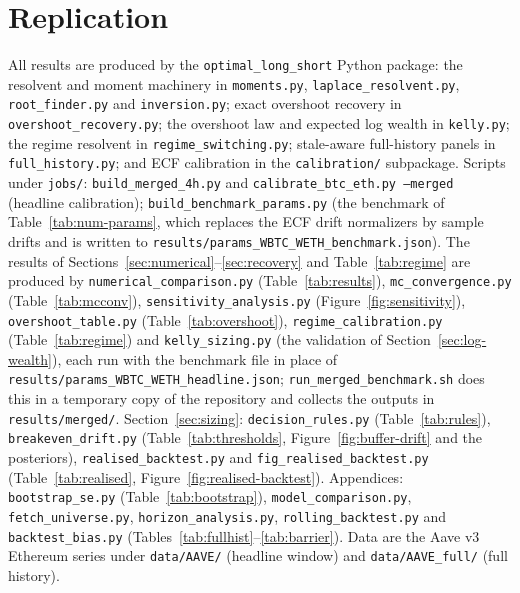 \documentclass[11pt]{article}
\theoremstyle{plain}
\theoremstyle{definition}
\theoremstyle{remark}
\begin{document}
\section*{Replication}
{\sloppy All results are produced by the \texttt{optimal\_long\_short} Python package: the resolvent and
moment machinery in \texttt{moments.py}, \texttt{laplace\_resolvent.py}, \texttt{root\_finder.py} and
\texttt{inversion.py}; exact overshoot recovery in \texttt{overshoot\_recovery.py}; the overshoot law
and expected log wealth in \texttt{kelly.py}; the regime resolvent in \texttt{regime\_switching.py};
stale-aware full-history panels in \texttt{full\_history.py}; and ECF calibration in the
\texttt{calibration/} subpackage. Scripts under \texttt{jobs/}: \texttt{build\_merged\_4h.py} and
\texttt{calibrate\_btc\_eth.py --merged} (headline calibration); \texttt{build\_benchmark\_params.py}
(the benchmark of Table~\ref{tab:num-params}, which replaces the ECF drift normalizers by sample
drifts and is written to \texttt{results/params\_WBTC\_WETH\_benchmark.json}). The results of
Sections~\ref{sec:numerical}--\ref{sec:recovery} and Table~\ref{tab:regime} are produced by
\texttt{numerical\_comparison.py} (Table~\ref{tab:results}), \texttt{mc\_convergence.py}
(Table~\ref{tab:mcconv}), \texttt{sensitivity\_analysis.py} (Figure~\ref{fig:sensitivity}),
\texttt{overshoot\_table.py} (Table~\ref{tab:overshoot}), \texttt{regime\_calibration.py}
(Table~\ref{tab:regime}) and \texttt{kelly\_sizing.py} (the validation of
Section~\ref{sec:log-wealth}), each run with the benchmark file in place of
\texttt{results/params\_WBTC\_WETH\_headline.json}; \texttt{run\_merged\_benchmark.sh} does this in a
temporary copy of the repository and collects the outputs in \texttt{results/merged/}. Section~\ref{sec:sizing}: \texttt{decision\_rules.py}
(Table~\ref{tab:rules}), \texttt{breakeven\_drift.py} (Table~\ref{tab:thresholds},
Figure~\ref{fig:buffer-drift} and the posteriors), \texttt{realised\_backtest.py} and
\texttt{fig\_realised\_backtest.py} (Table~\ref{tab:realised}, Figure~\ref{fig:realised-backtest}).
Appendices: \texttt{bootstrap\_se.py} (Table~\ref{tab:bootstrap}), \texttt{model\_comparison.py},
\texttt{fetch\_universe.py}, \texttt{horizon\_analysis.py}, \texttt{rolling\_backtest.py} and
\texttt{backtest\_bias.py} (Tables~\ref{tab:fullhist}--\ref{tab:barrier}). Data are the Aave v3
Ethereum series under \texttt{data/AAVE/} (headline window) and \texttt{data/AAVE\_full/} (full
history).\par}



\end{document}
